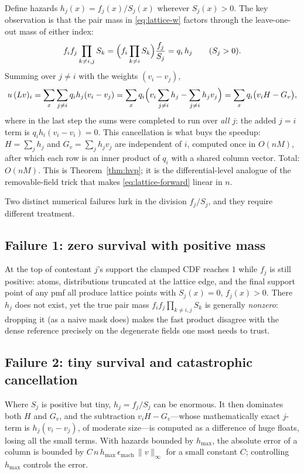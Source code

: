 \documentclass[11pt]{article}
\theoremstyle{definition}
\theoremstyle{remark}
\begin{document}
Define hazards $h_j(x) = f_j(x)/S_j(x)$ wherever $S_j(x) > 0$.  The key
observation is that the pair mass in \eqref{eq:lattice-w} factors through
the leave-one-out mass of either index:
\[
  f_i f_j \prod_{k\ne i,j} S_k
  = \Bigl( f_i \prod_{k \ne i} S_k \Bigr) \frac{f_j}{S_j}
  = q_i\, h_j
  \qquad (S_j > 0).
\]
Summing over $j \ne i$ with the weights $(v_i - v_j)$,
\[
  u\,(Lv)_i
  = \sum_x \sum_{j \ne i} q_i h_j (v_i - v_j)
  = \sum_x q_i \Bigl( v_i \sum_{j\ne i} h_j - \sum_{j \ne i} h_j v_j \Bigr)
  = \sum_x q_i \bigl( v_i H - G_v \bigr),
\]
where in the last step the sums were completed to run over \emph{all} $j$:
the added $j = i$ term is $q_i h_i (v_i - v_i) = 0$.  This cancellation is
what buys the speedup: $H = \sum_j h_j$ and $G_v = \sum_j h_j v_j$ are
independent of $i$, computed once in $O(nM)$, after which each row is an
inner product of $q_i$ with a shared column vector.  Total: $O(nM)$.  This
is Theorem~\ref{thm:hvp}; it is the differential-level analogue of the
removable-field trick that makes \eqref{eq:lattice-forward} linear in $n$.

Two distinct numerical failures lurk in the division $f_j/S_j$, and they
require different treatment.

\subsection{Failure 1: zero survival with positive mass}

At the top of contestant $j$'s support the clamped CDF reaches $1$ while
$f_j$ is still positive: atoms, distributions truncated at the lattice edge,
and the final support point of any pmf all produce lattice points with
$S_j(x) = 0$, $f_j(x) > 0$.  There $h_j$ does not exist, yet the true pair
mass $f_i f_j \prod_{k \ne i,j} S_k$ is generally \emph{nonzero}: dropping
it (as a naive mask does) makes the fast product disagree with the dense
reference precisely on the degenerate fields one most needs to trust.

\subsection{Failure 2: tiny survival and catastrophic cancellation}

Where $S_j$ is positive but tiny, $h_j = f_j/S_j$ can be enormous.  It then
dominates both $H$ and $G_v$, and the subtraction $v_i H - G_v$---whose
mathematically exact $j$-term is $h_j(v_i - v_j)$, of moderate size---is
computed as a difference of huge floats, losing all the small terms.  With
hazards bounded by $h_{\max}$, the absolute error of a column is bounded by
$C\,n\,h_{\max}\,\epsilon_{\mathrm{mach}}\,\|v\|_\infty$ for a small
constant $C$; controlling $h_{\max}$ controls the error.
\end{document}
